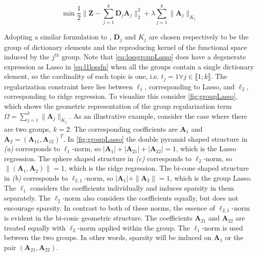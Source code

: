 \begin{equation} \label{eq:lossgroupLasso}
 \min \frac{1}{2} \parallel \mathbf{Z} - \sum_{j=1}^{k} \mathbf{D}_{j} \mathbf{A}_{j} \parallel_{2}^{2} + \lambda \sum_{j=1}^{k} \parallel \mathbf{A}_{j} \parallel_{K_{j}}
\end{equation}

Adopting a similar formulation to \citep{Lin2006}, $\mathbf{D}_{j}$ and $K_{j}$ are chosen respectively to be the group of dictionary elements and the reproducing kernel of the functional space induced by the $j^{th}$ group. Note that \cref{eq:lossgroupLasso} does have a degenerate expression as Lasso in \cref{eq:l1lossfn} when all the groups contain a single dictionary element, so the cardinality of each topic is one, i.e. $t_{j} = 1 \forall j \in \llbracket1 ; k \rrbracket$. The regularization constraint here lies between $\ell_{1}$, corresponding to Lasso, and $\ell_{2}$, corresponding to ridge regression. To visualize this consider \cref{fig:groupLasso}, which shows the geometric representation of the group regularization term $\Omega = \sum_{j=1}^{k} \parallel \mathbf{A}_{j} \parallel_{K_{j}}$. As an illustrative example, consider the case where there are two groups, $k = 2$. The corresponding coefficients are $\mathbf{A}_{1}$ and $\mathbf{A}_{2} = (\mathbf{A}_{11},\mathbf{A}_{12})^{T}$. In \cref{fig:groupLasso} the double pyramid shaped structure in \textit{(a)} corresponds to $\ell_{1}$-norm, so $|\mathbf{A}_{1}| + |\mathbf{A}_{21}|+ |\mathbf{A}_{22}| = 1$, which is the Lasso regression. The sphere shaped structure in \textit{(c)} corresponds to $\ell_{2}$-norm, so $\parallel (\mathbf{A}_{1}, \mathbf{A}_{2}) \parallel = 1$, which is the ridge regression. The bi-cone shaped structure in \textit{(b)} corresponds to $\ell_{2,1}$-norm, so $ |\mathbf{A}_{1}| + \parallel \mathbf{A}_{2} \parallel = 1$, which is the group Lasso. The $\ell_{1}$ considers the coefficients individually and induces sparsity in them separately. The $\ell_{2}$-norm also considers the coefficients equally, but does not encourage sparsity. In contrast to both of these norms, the essence of $\ell_{2,1}$-norm is evident in the bi-conic geometric structure. The coefficients $\mathbf{A}_{21}$ and $\mathbf{A}_{22}$ are treated equally with $\ell_{2}$-norm applied within the group. The $\ell_{1}$-norm is used between the two groups. In other words, sparsity will be induced on $\mathbf{A}_{1}$ or the pair $(\mathbf{A}_{21},\mathbf{A}_{22})$.

